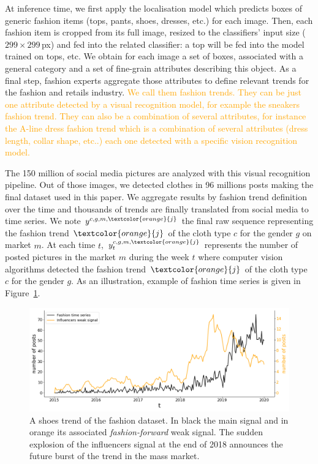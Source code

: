 \documentclass[10pt]{article} %
\begin{document}
At inference time, we first apply the localisation model which predicts boxes of generic fashion items (tops, pants, shoes, dresses, etc.) for each image. Then, each fashion item is cropped from its full image, resized to the classifiers' input size ($299\times299\,$px) and fed into the related classifier: a top will be fed into the model trained on tops, etc. We obtain for each image a set of boxes, associated with a general category and a set of fine-grain attributes describing this object. As a final step, fashion experts aggregate those attributes to define relevant trends for the fashion and retails industry. \textcolor{orange}{We call them fashion trends. They can be just one attribute detected by a visual recognition model, for example the sneakers fashion trend. They can also be a combination of several attributes, for instance the A-line dress fashion trend which is a combination of several attributes (dress length, collar shape, etc..) each one detected with a specific vision recognition model.}

The 150 million of social media pictures are analyzed with this visual recognition pipeline. Out of those images, we detected clothes in 96 millions posts making the final dataset used in this paper. We aggregate results by fashion trend definition over the time and  thousands of trends are finally translated from social media to time series. We note $y^{c,g,m,\textcolor{orange}{j}}$ the final raw sequence representing the fashion trend $\textcolor{orange}{j}$ of the cloth type $c$ for the gender $g$ on market $m$. At each time $t$, $y^{c,g,m,\textcolor{orange}{j}}_t$ represents the number of posted pictures in the market $m$ during the week $t$ where computer vision algorithms detected the fashion trend $\textcolor{orange}{j}$ of the cloth type $c$ for the gender $g$. As an illustration, example of fashion time series is given in Figure~\ref{fig:oneemergingtrend}.

\begin{figure}
  \centering
    \includegraphics[width=1.\linewidth]{br_female_shoes_262}
  \caption{A shoes trend of the fashion dataset. In black the main signal and in orange its associated \textit{fashion-forward} weak signal. The sudden explosion of the influencers signal at the end of 2018 announces the future burst of the trend in the mass market.}
\label{fig:oneemergingtrend}
\end{figure}
\end{document}
